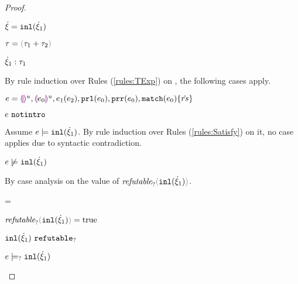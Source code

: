 \begin{proof}
\begin{byCases}
\begin{byCases}
        
    \end{byCases}
\item[\text{(\ref{rule:CTInl})}]
    \begin{pfsteps*}
    \item $\dot{\xi}=\mathtt{inl}(\dot{\xi}_1)$ 
    \item $\tau=\tsum{\tau_1}{\tau_2}$ 
    \item $\dot{\xi}_1 : \tau_1$  
    \end{pfsteps*}
    By rule induction over Rules (\ref{rules:TExp}) on , the following cases apply.
    \begin{byCases}
    \item[\text{(\ref{rule:TEHole}),(\ref{rule:THole}),(\ref{rule:TAp}),(\ref{rule:TPrl}),(\ref{rule:TPrr}),(\ref{rule:TMatchZPre}),(\ref{rule:TMatchNZPre})}]
        \begin{pfsteps*}
        \item $e=\textcolor{violet}{\llparenthesis}\textcolor{violet}{\rrparenthesis}^{u},\textcolor{violet}{\llparenthesis} e_0\textcolor{violet}{\rrparenthesis}^{u},e_1(e_2),\mathtt{prl}(e_0),\mathtt{prr}(e_0),\mathtt{match}(e_0) \{\hat{rs}\}$ 
        \item $e ~\mathtt{notintro}$  
        \end{pfsteps*}
        Assume $e \models \mathtt{inl}(\dot{\xi}_1)$. By rule induction over Rules (\ref{rules:Satisfy}) on it, no case applies due to syntactic contradiction.
        \begin{pfsteps*}
        \item $e \not\models \mathtt{inl}(\dot{\xi}_1)$  
        \end{pfsteps*}
        By case analysis on the value of $\frefutable{\cinl{\hxi_1}}$.
        \begin{byCases}
        \item[\frefutable{\cinl{\hxi_1}}=\true]
            \begin{pfsteps*}
            \item $\frefutable{\cinl{\hxi_1}}=\true$  
            \item $\mathtt{inl}(\dot{\xi}_1) ~\mathtt{refutable}_?$  
            \item $e \models_{?} \mathtt{inl}(\dot{\xi}_1)$  

\end{pfsteps*}
\end{byCases}
\end{byCases}
\end{byCases}
\end{proof}
